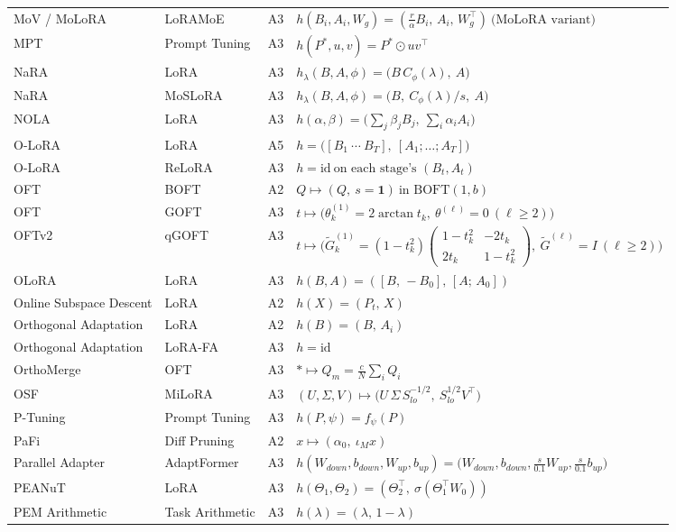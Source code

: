 \begin{longtable}{@{}>{\raggedright\arraybackslash}p{2.4cm}>{\raggedright\arraybackslash}p{2.4cm}c>{\raggedright\arraybackslash}p{8.6cm}@{}}
MoV / MoLoRA & LoRAMoE & A3 & $h(B_i,A_i,W_g)=(\tfrac r\alpha B_i,\,A_i,\,W_g^\top)\ \text{(MoLoRA variant)}$\\
MPT & Prompt Tuning & A3 & $h(P^*,u,v)=P^*\odot uv^\top$\\
NaRA & LoRA & A3 & $h_\lambda(B,A,\phi)=\big(B\,C_\phi(\lambda),\ A\big)$\\
NaRA & MoSLoRA & A3 & $h_\lambda(B,A,\phi)=\big(B,\ C_\phi(\lambda)/s,\ A\big)$\\
NOLA & LoRA & A3 & $h(\alpha,\beta)=\Big(\sum_j\beta_jB_j,\ \sum_i\alpha_iA_i\Big)$\\
O-LoRA & LoRA & A5 & $h=\big([B_1\ \cdots\ B_T],\ [A_1;\dots;A_T]\big)$\\
O-LoRA & ReLoRA & A3 & $h=\mathrm{id}\ \text{on each stage's }(B_t,A_t)$\\
OFT & BOFT & A2 & $Q\mapsto(Q,\ s=\mathbf 1)\ \text{in BOFT}(1,b)$\\
OFT & GOFT & A3 & $t\mapsto\big(\theta^{(1)}_k=2\arctan t_k,\ \theta^{(\ell)}=0\ (\ell\ge2)\big)$\\
OFTv2 & qGOFT & A3 & $t\mapsto\Big(\tilde G^{(1)}_k=(1-t_k^2)\begin{pmatrix}1-t_k^2&-2t_k\\2t_k&1-t_k^2\end{pmatrix},\ \tilde G^{(\ell)}=I\ (\ell\ge2)\Big)$\\
OLoRA & LoRA & A3 & $h(B,A)=([B,\,-B_0],\,[A;\,A_0])$\\
Online Subspace Descent & LoRA & A2 & $h(X)=(P_t,\,X)$\\
Orthogonal Adaptation & LoRA & A2 & $h(B)=(B,\,A_i)$\\
Orthogonal Adaptation & LoRA-FA & A3 & $h=\mathrm{id}$\\
OrthoMerge & OFT & A3 & $\ast\mapsto Q_m=\tfrac{c}{N}\textstyle\sum_iQ_i$\\
OSF & MiLoRA & A3 & $(U,\Sigma,V)\mapsto\big(U\,\Sigma\,S_{lo}^{-1/2},\ S_{lo}^{1/2}V^\top\big)$\\
P-Tuning & Prompt Tuning & A3 & $h(P,\psi)=f_\psi(P)$\\
PaFi & Diff Pruning & A2 & $x\mapsto(\alpha_0,\ \iota_M x)$\\
Parallel Adapter & AdaptFormer & A3 & $h(W_{down},b_{down},W_{up},b_{up})=\big(W_{down},b_{down},\tfrac{s}{0.1}W_{up},\tfrac{s}{0.1}b_{up}\big)$\\
PEANuT & LoRA & A3 & $h(\Theta_1,\Theta_2)=(\Theta_2^\top,\ \sigma(\Theta_1^\top W_0))$\\
PEM Arithmetic & Task Arithmetic & A3 & $h(\lambda)=(\lambda,\,1-\lambda)$\\

\end{longtable}

